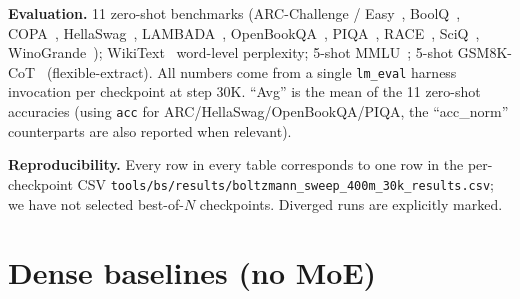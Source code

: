 \documentclass[oneside]{article}
\begin{document}
\textbf{Evaluation.} 11 zero-shot benchmarks (ARC-Challenge / Easy~\citep{clark2018think}, BoolQ~\citep{clark2019boolq}, COPA~\citep{roemmele2011choice}, HellaSwag~\citep{zellers2019hellaswag}, LAMBADA~\citep{paperno2016lambada}, OpenBookQA~\citep{mihaylov2018can}, PIQA~\citep{bisk2020piqa}, RACE~\citep{lai2017race}, SciQ~\citep{welbl2017crowdsourcing}, WinoGrande~\citep{sakaguchi2020winogrande}); WikiText~\citep{merity2017pointer} word-level perplexity; 5-shot MMLU~\citep{hendrycks2021measuring}; 5-shot GSM8K-CoT~\citep{cobbe2021training} (flexible-extract). All numbers come from a single \texttt{lm\_eval} harness invocation per checkpoint at step 30K. ``Avg'' is the mean of the 11 zero-shot accuracies (using \texttt{acc} for ARC/HellaSwag/OpenBookQA/PIQA, the ``acc\_norm'' counterparts are also reported when relevant).

\textbf{Reproducibility.} Every row in every table corresponds to one row in the per-checkpoint CSV \texttt{tools/bs/results/boltzmann\_sweep\_400m\_30k\_results.csv}; we have not selected best-of-$N$ checkpoints. Diverged runs are explicitly marked.


\section{Dense baselines (no MoE)}
\label{sec:dense}
\end{document}
